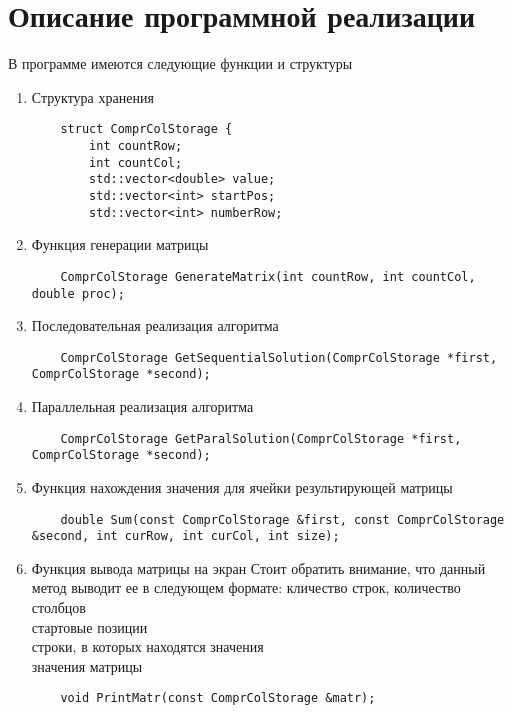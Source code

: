 \documentclass{report}
\begin{document}
\section*{Описание программной реализации}
В программе имеются следующие функции и структуры
\begin{enumerate}
\item Структура хранения
\begin{lstlisting}
	struct ComprColStorage {
		int countRow;
  		int countCol;
  		std::vector<double> value;
  		std::vector<int> startPos;
		std::vector<int> numberRow;
\end{lstlisting}

\item Функция генерации матрицы
\begin{lstlisting}
	ComprColStorage GenerateMatrix(int countRow, int countCol, double proc);
\end{lstlisting}

\item Последовательная реализация алгоритма
\begin{lstlisting}
	ComprColStorage GetSequentialSolution(ComprColStorage *first, ComprColStorage *second);
\end{lstlisting}

\item Параллельная реализация алгоритма
\begin{lstlisting}
	ComprColStorage GetParalSolution(ComprColStorage *first, ComprColStorage *second);
\end{lstlisting}

\item Функция нахождения значения для ячейки результирующей матрицы
\begin{lstlisting}
	double Sum(const ComprColStorage &first, const ComprColStorage &second, int curRow, int curCol, int size);
\end{lstlisting}

\item Функция вывода матрицы на экран
Стоит обратить внимание, что данный метод выводит ее в следующем формате:
кличество строк, количество столбцов\\ стартовые позиции\\строки, в которых находятся значения\\значения матрицы\\
\begin{lstlisting}
	void PrintMatr(const ComprColStorage &matr);
\end{lstlisting}

\end{enumerate}
\newpage
\end{document}

